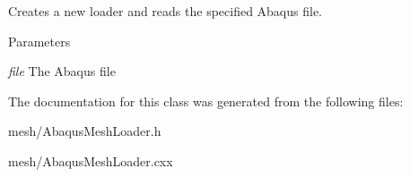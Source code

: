 Creates a new loader and reads the specified Abaqus file. 


\begin{DoxyParams}{Parameters}
\item[{\em file}]The Abaqus file \end{DoxyParams}


The documentation for this class was generated from the following files:\begin{DoxyCompactItemize}
\item 
mesh/AbaqusMeshLoader.h\item 
mesh/AbaqusMeshLoader.cxx\end{DoxyCompactItemize}
